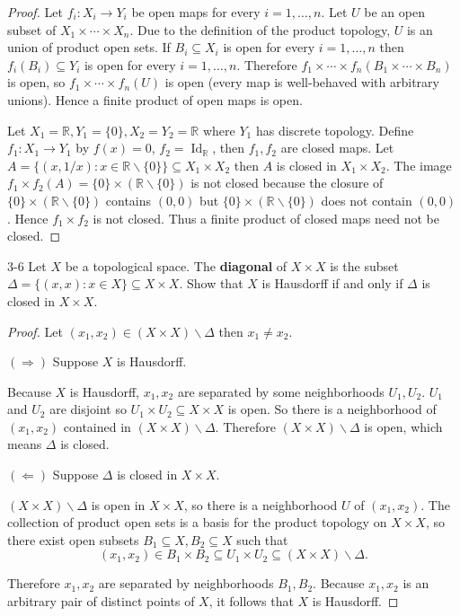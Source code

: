 \begin{proof}
    Let $f_{i}: X_{i}\to Y_{i}$ be open maps for every $i = 1,\ldots,n$. Let $U$ be an open subset of $X_{1}\times\cdots\times X_{n}$. Due to the definition of the product topology, $U$ is an union of product open sets. If $B_{i}\subseteq X_{i}$ is open for every $i = 1,\ldots,n$ then $f_{i}(B_{i})\subseteq Y_{i}$ is open for every $i = 1,\ldots,n$. Therefore $f_{1}\times\cdots\times f_{n}(B_{1}\times\cdots\times B_{n})$ is open, so $f_{1}\times\cdots\times f_{n}(U)$ is open (every map is well-behaved with arbitrary unions). Hence a finite product of open maps is open.

    Let $X_{1} = \mathbb{R}, Y_{1} = \{ 0 \}, X_{2} = Y_{2} = \mathbb{R}$ where $Y_{1}$ has discrete topology. Define $f_{1}: X_{1}\to Y_{1}$ by $f(x) = 0$, $f_{2} = \operatorname{Id}_{\mathbb{R}}$, then $f_{1}, f_{2}$ are closed maps. Let $A = \{ (x, 1/x): x\in\mathbb{R}\smallsetminus\{0\} \}\subseteq X_{1}\times X_{2}$ then $A$ is closed in $X_{1}\times X_{2}$. The image $f_{1}\times f_{2}(A) = \{ 0 \}\times (\mathbb{R}\smallsetminus\{0\})$ is not closed because the closure of $\{ 0 \}\times (\mathbb{R}\smallsetminus\{0\})$ contains $(0, 0)$ but $\{ 0 \}\times (\mathbb{R}\smallsetminus\{0\})$ does not contain $(0, 0)$. Hence $f_{1}\times f_{2}$ is not closed. Thus a finite product of closed maps need not be closed.
\end{proof}

\begin{problem}{3-6}
Let $X$ be a topological space. The \textbf{diagonal} of $X\times X$ is the subset $\Delta = \{ (x, x): x\in X \}\subseteq X\times X$. Show that $X$ is Hausdorff if and only if $\Delta$ is closed in $X\times X$.
\end{problem}

\begin{proof}
    Let $(x_{1}, x_{2})\in (X\times X)\smallsetminus\Delta$ then $x_{1}\ne x_{2}$.

    $(\Longrightarrow)$ Suppose $X$ is Hausdorff.

    Because $X$ is Hausdorff, $x_{1}, x_{2}$ are separated by some neighborhoods $U_{1}, U_{2}$. $U_{1}$ and $U_{2}$ are disjoint so $U_{1}\times U_{2}\subseteq X\times X$ is open. So there is a neighborhood of $(x_{1}, x_{2})$ contained in $(X\times X)\smallsetminus\Delta$. Therefore $(X\times X)\smallsetminus\Delta$ is open, which means $\Delta$ is closed.

    $(\Longleftarrow)$ Suppose $\Delta$ is closed in $X\times X$.

    $(X\times X)\smallsetminus\Delta$ is open in $X\times X$, so there is a neighborhood $U$ of $(x_{1}, x_{2})$. The collection of product open sets is a basis for the product topology on $X\times X$, so there exist open subsets $B_{1}\subseteq X, B_{2}\subseteq X$ such that
    \[
        (x_{1}, x_{2})\in B_{1}\times B_{2}\subseteq U_{1}\times U_{2}\subseteq (X\times X)\smallsetminus\Delta.
    \]

    Therefore $x_{1}, x_{2}$ are separated by neighborhoods $B_{1}, B_{2}$. Because $x_{1}, x_{2}$ is an arbitrary pair of distinct points of $X$, it follows that $X$ is Hausdorff.
\end{proof}


